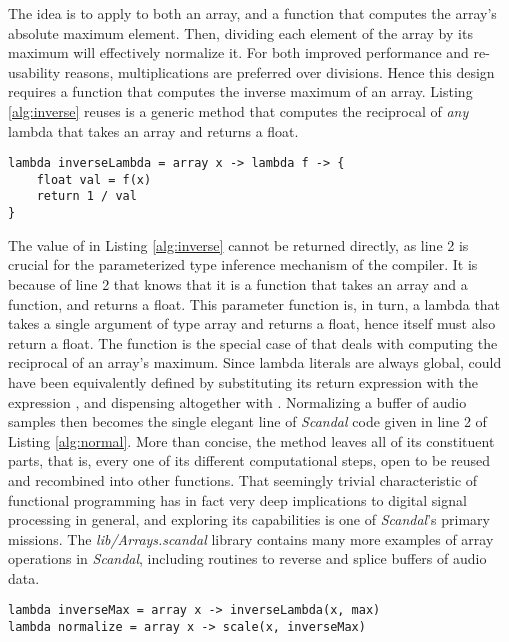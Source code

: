 The idea is to apply to  both an array, and a function that computes the array's absolute maximum element. Then, dividing each element of the array by its maximum will effectively normalize it. For both improved performance and re-usability reasons, multiplications are preferred over divisions. Hence this design requires a function that computes the inverse maximum of an array. Listing \ref{alg:inverse} reuses is a generic method that computes the reciprocal of \emph{any} lambda that takes an array and returns a float.

\begin{lstlisting}[emph={lambda,array,float,return},emphstyle={\textbf},caption={Computing the inverse of an \il{array -> float} lambda.},label={alg:inverse}]
lambda inverseLambda = array x -> lambda f -> {
	float val = f(x)
	return 1 / val
}
\end{lstlisting}

The value of  in Listing \ref{alg:inverse} cannot be returned directly, as line 2 is crucial for the parameterized type inference mechanism of the compiler. It is because of line 2 that  knows that it is a function that takes an array and a function, and returns a float. This parameter function is, in turn, a lambda that takes a single argument of type array and returns a float, hence  itself must also return a float. The function  is the special case of  that deals with computing the reciprocal of an array's maximum. Since lambda literals are always global,  could have been equivalently defined by substituting its return expression with the expression , and dispensing altogether with . Normalizing a buffer of audio samples then becomes the single elegant line of \emph{Scandal} code given in line 2 of Listing \ref{alg:normal}. More than concise, the  method leaves all of its constituent parts, that is, every one of its different computational steps, open to be reused and recombined into other functions. That seemingly trivial characteristic of functional programming has in fact very deep implications to digital signal processing in general, and exploring its capabilities is one of \emph{Scandal}'s primary missions. The \emph{lib/Arrays.scandal} library contains many more examples of array operations in \emph{Scandal}, including routines to reverse and splice buffers of audio data.

\begin{lstlisting}[emph={lambda,array},emphstyle={\textbf},caption={Normalizing an array.},label={alg:normal}]
lambda inverseMax = array x -> inverseLambda(x, max)
lambda normalize = array x -> scale(x, inverseMax)
\end{lstlisting}


